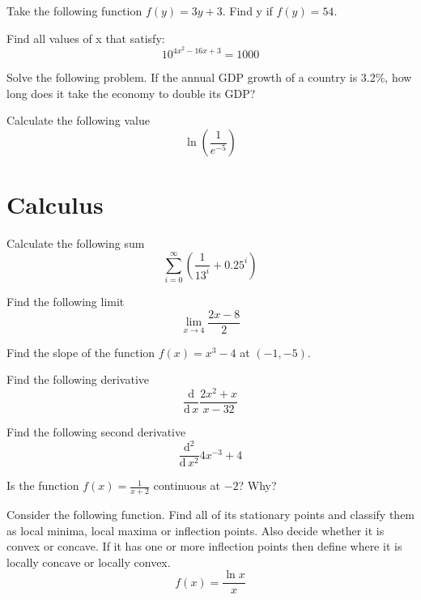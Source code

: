 \documentclass[10pt]{article}
\newenvironment{problem}[2][Problem]{\begin{trivlist}
\item[\hskip \labelsep {\bfseries #1}\hskip \labelsep {\bfseries #2.}]}{\end{trivlist}}
\begin{document}
\begin{problem}{2.2}
Take the following function $f(y)=3y+3$. Find y if $f(y)=54$.
\end{problem}

\begin{problem}{2.3}
Find all values of x that satisfy:
$$10^{4x^2-16x+3}=1000$$
\end{problem}

\begin{problem}{2.4}
Solve the following problem. If the annual GDP growth of a country is 3.2\%, how long does it take the economy to double its GDP?
\end{problem}

\begin{problem}{2.5}
Calculate the following value
$$\ln\left(\frac{1}{e^{-5}} \right)$$
\end{problem}

\section{Calculus}

\begin{problem}{3.1}
Calculate the following sum
$$\sum\limits_{i=0}^{\infty} \left( \frac{1}{13^i}+0.25^i\right)$$
\end{problem}

\begin{problem}{3.2}
Find the following limit
$$\lim\limits_{x \rightarrow 4}\frac{2x-8}{2}$$
\end{problem}

\begin{problem}{3.3}
Find the slope of the function $f(x)=x^3-4$ at $(-1,-5)$.
\end{problem}

\begin{problem}{3.4}
Find the following derivative
$$\frac{\mathrm{d}}{\mathrm{d}\, x} \frac{2x^2+x}{x-32}$$
\end{problem}

\begin{problem}{3.5}
Find the following second derivative
 $$\frac{\mathrm{d^2}}{\mathrm{d}\, x^2} 4x^{-3}+4$$
\end{problem}

\begin{problem}{3.6}
Is the function  $f(x)=\frac{1}{x+2}$ continuous at $-2$? Why?
\end{problem}

\begin{problem}{3.7}
Consider the following function. Find all of its stationary points and classify them as local minima, local maxima or inflection points. Also decide whether it is convex or concave. If it has one or more inflection points then define where it is locally concave or locally convex.
$$f(x)=\frac{\ln x}{x}$$
\end{problem}
\end{document}
